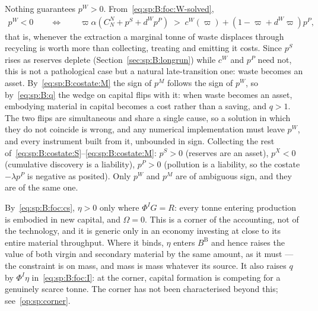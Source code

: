 Nothing guarantees $p^W>0$. From~\eqref{eq:sp:B:foc:W-solved},
\begin{align}
p^W<0
\qquad\Longleftrightarrow\qquad
\varpi\alpha\left(C^N_N+p^S+d^Wp^P\right)
\;>\;
c^W\!\left(\varpi\right)+\left(1-\varpi+d^W\varpi\right)p^P,
\label{eq:sp:B:pW-sign}
\end{align}
that is, whenever the extraction a marginal tonne of waste displaces through recycling is worth more
than collecting, treating and emitting it costs. Since $p^S$ rises as reserves deplete
(Section~\ref{sec:sp:B:longrun}) while $c^W$ and $p^P$ need not, this is not a pathological case but a
natural late-transition one: waste becomes an asset. By~\eqref{eq:sp:B:costate:M} the sign of $p^M$
follows the sign of $p^W$, so by~\eqref{eq:sp:B:q} the wedge on capital flips with it: when waste
becomes an asset, embodying material in capital becomes a cost rather than a saving, and $q>1$. The
two flips are simultaneous and share a single cause, so a solution in which they do not coincide is
wrong, and any numerical implementation must leave $p^W$, and every instrument built from it,
unbounded in sign. Collecting the rest
of~\eqref{eq:sp:B:costate:S}--\eqref{eq:sp:B:costate:M}: $p^S>0$ (reserves are an asset), $p^X<0$
(cumulative discovery is a liability), $p^P>0$ (pollution is a liability, so the costate
$-\lambda p^P$ is negative as posited). Only $p^W$ and $p^M$ are of ambiguous sign, and they are of
the same one.

 By~\eqref{eq:sp:B:foc:cs}, $\eta>0$ only where $\Phi^IG=R$: every
tonne entering production is embodied in new capital, and $\Omega=0$. This is a corner of the
accounting, not of the technology, and it is generic only in an economy investing at close to its
entire material throughput. Where it binds, $\eta$ enters $B^{\mathrm B}$ and hence raises the value of
both virgin and secondary material by the same amount, as it must --- the constraint is on mass, and
mass is mass whatever its source. It also raises $q$ by $\Phi^I\eta$ in~\eqref{eq:sp:B:foc:I}: at the
corner, capital formation is competing for a genuinely scarce tonne. The corner has not been
characterised beyond this; see~\ref{op:sp:corner}.

